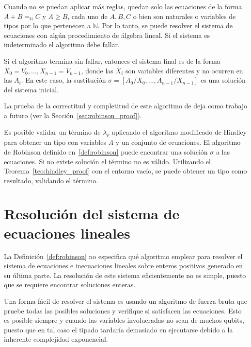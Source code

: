 \begin{definicion}
Cuando no se puedan aplicar más reglas, quedan solo las ecuaciones de la forma $A + B =_\mathbb{N} C$ y $A \geq B$, cada uno de $A, B, C$ o bien son naturales o variables de tipos por lo que pertenecen a $\mathbb{N}$. Por lo tanto, se puede resolver el sistema de ecuaciones con algún procedimiento de álgebra lineal. Si el sistema es indeterminado el algoritmo debe fallar.

Si el algoritmo termina sin fallar, entonces el sistema final es de la forma $X_0 = V_0, \dots, X_{n-1} = V_{n-1}$, donde las $X_i$ son variables diferentes y no ocurren en las $A_i$. En este caso, la sustitución $\sigma = [A_0/X_0, \dots, A_{n-1}/X_{n-1}]$ es una solución del sistema inicial.  
\end{definicion}

La prueba de la correctitud y completitud de este algoritmo de deja como trabajo a futuro (ver la Sección~\ref{sec:robinson_proof}).

\begin{corolario}
Es posible validar un término de $\lambda_\rho$ aplicando el algoritmo modificado de Hindley para obtener un tipo con variables $A$ y un conjunto de ecuaciones. El algoritmo de Robinson definido en~\ref{def:robinson} puede encontrar una solución $\sigma$ a las ecuaciones. Si no existe solución el término no es válido. Utilizando el Teorema~\ref{teo:hindley_proof} con el entorno vacío, se puede obtener un tipo como resultado, validando el término.
\end{corolario}
 


\section{Resolución del sistema de ecuaciones lineales}

La Definición~\ref{def:robinson} no especifica qué algoritmo emplear para resolver el sistema de ecuaciones e inecuaciones lineales sobre enteros positivos generado en su última parte. La resolución de este sistema eficientemente no es simple, puesto que se requiere encontrar soluciones enteras. 

Una forma fácil de resolver el sistema es usando un algoritmo de fuerza bruta que pruebe todas las posibles soluciones y verifique si satisfacen las ecuaciones. Esto es posible siempre y cuando las variables involucradas no sean de muchos qubits, puesto que en tal caso el tipado tardaría demasiado en ejecutarse debido a la inherente complejidad exponencial.

